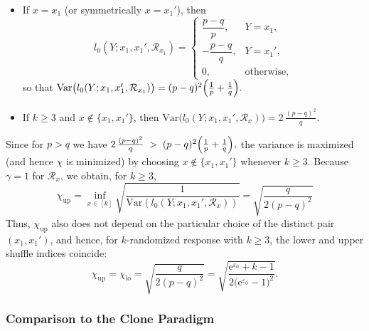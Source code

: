 \documentclass{article}
\theoremstyle{plain}
\theoremstyle{definition}
\begin{document}
\begin{itemize}
  \item If $x=x_1$ (or symmetrically $x=x_1'$), then
  \[
    l_0(Y;x_1,x_1',\mathcal R_{x_1})
    =
    \begin{cases}
      \dfrac{p-q}{p}, & Y=x_1,\\[4pt]
      -\dfrac{p-q}{q}, & Y=x_1',\\[4pt]
      0, & \text{otherwise},
    \end{cases}
  \]
  so that
  $
    \mathrm{Var}\bigl(l_0(Y;x_1,x_1',\mathcal R_{x_1})\bigr)
    = (p-q)^2\Bigl(\frac{1}{p}+\frac{1}{q}\Bigr).
  $

  \item If $k\ge3$ and $x\notin\{x_1,x_1'\}$, then
  $
    \mathrm{Var}\bigl(l_0(Y;x_1,x_1',\mathcal R_x)\bigr)
    = 2\,\frac{(p-q)^2}{q}.
  $
\end{itemize}
Since for $p>q$ we have
$
  2\,\frac{(p-q)^2}{q}
  \;>\;
  (p-q)^2\Bigl(\frac{1}{p}+\frac{1}{q}\Bigr),
$
the variance is maximized (and hence $\chi$ is minimized) by choosing
$x\notin\{x_1,x_1'\}$ whenever $k\ge3$. Because $\gamma=1$ for
$\mathcal R_x$, we obtain, for $k\ge3$,
\[
  \chi_{\mathrm{up}}
  = \inf_{x\in[k]} \sqrt{\frac{1}{\mathrm{Var}(l_0(Y;x_1,x_1',\mathcal R_x))}}
  = \sqrt{\frac{q}{2(p-q)^2}}
\]
Thus, $\chi_{\mathrm{up}}$ also does not depend on the particular
choice of the distinct pair $(x_1,x_1')$, and hence, for $k$-randomized response with $k\ge3$, the lower and upper
shuffle indices coincide:
\[
  \chi_{\mathrm{up}} = \chi_{\mathrm{lo}}
  = \sqrt{\frac{q}{2(p-q)^2}}
  = \sqrt{\frac{\mathrm e^{\varepsilon_0}+k-1}{2\bigl(\mathrm e^{\varepsilon_0}-1\bigr)^2}}.
\]

\subsubsection{Comparison to the Clone Paradigm}
\label{app:krr_comparison_to_clone}
\end{document}
